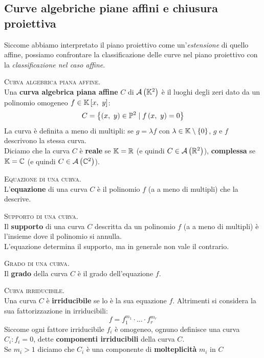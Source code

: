 	\subsection{Curve algebriche piane affini e chiusura proiettiva}
Siccome abbiamo interpretato il piano proiettivo come un'\textit{estensione} di quello affine, possiamo confrontare la classificazione delle curve nel piano proiettivo con la \textit{classificazione nel caso affine}.
\begin{define}\textsc{Curva algebrica piana affine}.\\
	Una \textbf{curva algebrica piana affine} $C$ di ${\mathcal{A}\left(\mathbb{K}^2\right)}$ è il luoghi degli zeri dato da un polinomio omogeneo $f\in\mathbb{K}\left[x,\ y\right]$:
\begin{equation}
	C=\left\{\left(x,\ y\right)\in\proj[2]{\ }\mid f\left(x,\ y\right)=0\right\}
\end{equation}
La curva è definita a meno di multipli: se $g=\lambda f$ con $\lambda\in\mathbb{K}\setminus\left\{0\right\}$, $g$ e $f$ descrivono la stessa curva.\\
Diciamo che la curva $C$ è \textbf{reale} se $\mathbb{K}=\mathbb{R}$ (e quindi $C\in{\ensuremath{\mathcal{A}\left(\mathbb{R}^2\right)}}$), \textbf{complessa} se $\mathbb{K}=\mathbb{C}$ (e quindi $C\in{\ensuremath{\mathcal{A}\left(\mathbb{C}^2\right)}}$).
\end{define}
\begin{define}\textsc{Equazione di una curva}.\\
L'\textbf{equazione} di una curva $C$ è il polinomio $f$ (a a meno di multipli) che la descrive.
\end{define}
\begin{define}\textsc{Supporto di una curva}.\\
Il \textbf{supporto} di una curva $C$ descritta da un polinomio $f$ (a a meno di multipli) è l'insieme dove il polinomio si annulla.\\
L'equazione determina il supporto, ma in generale non vale il contrario.
\end{define}
\begin{define}\textsc{Grado di una curva}.\\
Il \textbf{grado} della curva $C$ è il grado dell'equazione $f$.
\end{define}
\begin{define}\textsc{Curva irriducibile}.\\
	Una curva $C$ è \textbf{irriducibile} se lo è la sua equazione $f$. Altrimenti si considera la sua fattorizzazione in irriducibili:
	\begin{equation}
		f=f_1^{m_1}\cdot \ldots \cdot f_r^{m_r}
	\end{equation}
	Siccome ogni fattore irriducibile $f_i$ è omogeneo, ognuno definisce una curva $C_i\colon f_i=0$, dette \textbf{componenti irriducibili} della curva $C$.\\
	Se $m_i>1$ diciamo che $C_i$ è una componente di \textbf{molteplicità} $m_i$ in $C$
\end{define}
